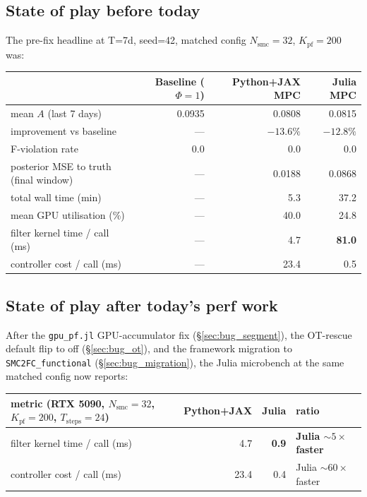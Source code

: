 \documentclass[11pt,a4paper]{article}
\begin{document}
\subsection{State of play before today}

The pre-fix headline at T=7d, seed=42, matched config
$N_{\text{smc}}=32$, $K_{\text{pf}}=200$ was:

\begin{center}
\begin{tabular}{lrrr}
  \toprule
                                        & Baseline ($\Phi=1$) & Python+JAX MPC & Julia MPC \\
  \midrule
  mean $A$ (last 7 days)                & 0.0935              & 0.0808         & 0.0815    \\
  improvement vs baseline               & ---                 & $-13.6\%$      & $-12.8\%$ \\
  F-violation rate                      & 0.0                 & 0.0            & 0.0       \\
  posterior MSE to truth (final window) & ---                 & 0.0188         & 0.0868    \\
  total wall time (min)                 & ---                 & 5.3            & 37.2      \\
  mean GPU utilisation (\%)             & ---                 & 40.0           & 24.8      \\
  filter kernel time / call (ms)        & ---                 & 4.7            & \textbf{81.0} \\
  controller cost / call (ms)           & ---                 & 23.4           & 0.5       \\
  \bottomrule
\end{tabular}
\end{center}

\subsection{State of play after today's perf work}

After the \texttt{gpu\_pf.jl} GPU-accumulator fix
(\S\ref{sec:bug_segment}), the OT-rescue default flip to off
(\S\ref{sec:bug_ot}), and the framework migration to
\texttt{SMC2FC\_functional} (\S\ref{sec:bug_migration}), the Julia
microbench at the same matched config now reports:

\begin{center}
\begin{tabular}{lrrl}
  \toprule
  metric (RTX 5090, $N_{\text{smc}}=32$, $K_{\text{pf}}=200$,
                     $T_{\text{steps}}=24$)
                                       & Python+JAX & Julia        & ratio \\
  \midrule
  filter kernel time / call (ms)       & 4.7        & \textbf{0.9} & \textbf{Julia $\sim 5\times$ faster} \\
  controller cost / call (ms)          & 23.4       & 0.4          & Julia $\sim 60\times$ faster \\
  \bottomrule
\end{tabular}
\end{center}
\end{document}
